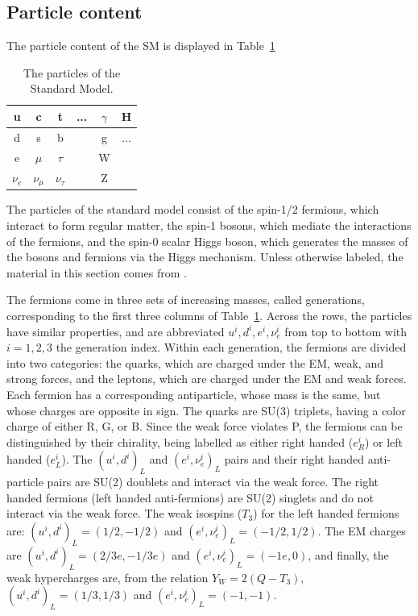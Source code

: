 \subsection{Particle content}

The particle content of the SM is displayed in Table~\ref{tab:sm}

\begin{table}[htbH]
\begin{center}
\begin{tabular}{| c | c | c | c | c | c |}
\hline
u & c & t & ... &$\gamma$ & H \\
\hline
d & s & b & & g & ...\\
\hline
e & $\mu$ & $\tau$ & & W & \\
\hline
$\nu_e$ & $\nu_\mu$ & $\nu_\tau$ & & Z & \\
\hline
\end{tabular}
\caption{The particles of the Standard Model.}
\label{tab:sm}
\end{center}
\end{table}

The particles of the standard model consist of the spin-1/2 fermions, which interact to form regular matter, the spin-1 bosons, which mediate the interactions of the fermions, and the spin-0 scalar Higgs boson, which generates the masses of the bosons and fermions via the Higgs mechanism. Unless otherwise labeled, the material in this section comes from \cite{Bettini}.

\indent The fermions come in three sets of increasing masses, called generations, corresponding to the first three columns of Table~\ref{tab:sm}. Across the rows, the particles have similar properties, and are abbreviated $u^i, d^i, e^i, \nu_e^i$ from top to bottom with $i=1,2,3$ the generation index. Within each generation, the fermions are divided into two categories: the quarks, which are charged under the EM, weak, and strong forces, and the leptons, which are charged under the EM and weak forces. Each fermion has a corresponding antiparticle, whose mass is the same, but whose charges are opposite in sign. The quarks are SU(3) triplets, having a color charge of either R, G, or B. Since the weak force violates P, the fermions can be distinguished by their chirality, being labelled as either right handed ($e^i_R$) or left handed ($e^i_L$). The $(u^i, d^i)_L$ and $(e^i, \nu_e^i)_L$ pairs and their right handed anti-particle pairs are SU(2) doublets and interact via the weak force. The right handed fermions (left handed anti-fermions) are SU(2) singlets and do not interact via the weak force. The weak isospins ($T_3$) for the left handed fermions are: $(u^i, d^i)_L = (1/2, -1/2)$ and $(e^i, \nu_e^i)_L = (-1/2, 1/2)$. The EM charges are $(u^i, d^i)_L = (2/3e, -1/3e)$ and $(e^i, \nu_e^i)_L = (-1e, 0)$, and finally, the weak hypercharges are, from the relation $Y_W = 2(Q-T_3)$, $(u^i, d^i)_L = (1/3, 1/3)$ and $(e^i, \nu_e^i)_L = (-1, -1)$.

